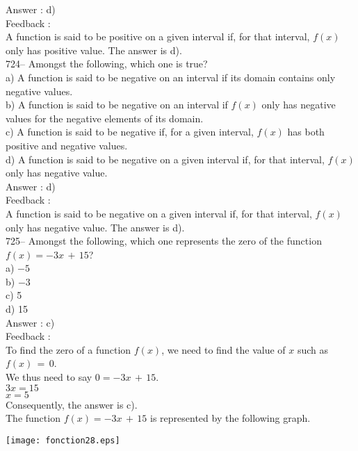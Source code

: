 \documentclass[letterpaper, 12pt]{article}
\begin{document}
Answer :  d)\\

Feedback : \\
A function is said to be positive on a given interval if, for that interval, $f(x)$ only has positive value. 
The answer is d).\\

724-- Amongst the following, which one is true?\\
a) A function is said to be negative on an interval if its domain contains only negative values. \\
b) A function is said to be negative on an interval if $f(x)$ only has negative values for the negative elements of its domain. \\
c) A function is said to be negative if, for a given interval, $f(x)$ has both positive and negative values.  \\
d) A function is said to be negative on a given interval if, for that interval, $f(x)$ only has negative value.  \\

Answer : d)\\

Feedback : \\
A function is said to be negative on a given interval if, for that interval, $f(x)$ only has negative value.
The answer is d).\\

725-- Amongst the following, which one represents the zero of the function $f(x)=-3x\,+\,15$?\\
a) $-5$\\
b) $-3$\\
c) 5\\
d) 15\\

Answer : c)\\

Feedback : \\
To find the zero of a function $f(x)$, we need to find the value of $x$ such as $f(x)\,=\,0$.\\
We thus need to say $0=-3x\,+\,15$.\\
$3x=15$\\
$x=5$\\
Consequently, the answer is c).\\
The function $f(x)=-3x\,+\,15$ is represented by the following graph.\\
    \begin{center}
    \texttt{[image: fonction28.eps]}
    \end{center}
\end{document}
